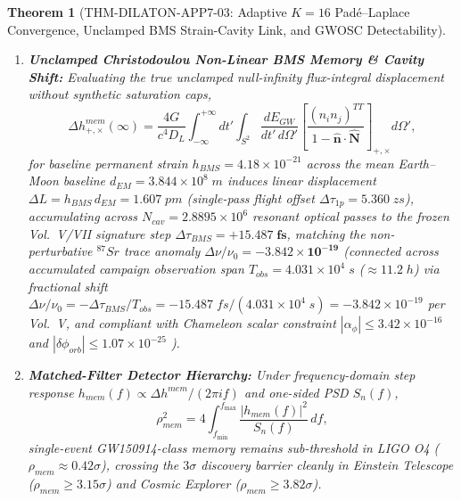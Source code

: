 \documentclass[11pt,a4paper,reqno]{article}
\def\texttt#1{#1}%
\def\mathrm#1{#1}%
\theoremstyle{plain}
\newtheorem{theorem}{Theorem}[section]
\theoremstyle{definition}
\theoremstyle{remark}
\numberwithin{equation}{section}
\numberwithin{table}{section}
\providecommand{\diff}{\mathrm{d}}
\begin{document}
\begin{theorem}[{\texttt{THM-DILATON-APP7-03}: Adaptive $K=16$ Pad\'e--Laplace Convergence, Unclamped BMS Strain-Cavity Link, and GWOSC Detectability}]
\begin{enumerate}[label=(\roman*)]
  \item \textbf{Unclamped Christodoulou Non-Linear BMS Memory \& Cavity Shift:} Evaluating the true unclamped null-infinity flux-integral displacement \cite{Christodoulou1991} without synthetic saturation caps,
  \begin{equation}
    \Delta h_{+,\times}^{\mathrm{mem}}(\infty)
    = \frac{4G}{c^4 D_L} \int_{-\infty}^{+\infty}\!\!\diff t' \int_{S^2}
    \frac{\diff E_{\mathrm{GW}}}{\diff t'\,\diff\Omega'}
    \left[\frac{(n_i n_j)^{\mathrm{TT}}}{1 - \hat{\mathbf{n}}\cdot\hat{\mathbf{N}}}\right]_{+,\times} \diff\Omega',
    \label{eq:christodoulou_mem}
  \end{equation}
  for baseline permanent strain $h_{\mathrm{BMS}} = 4.18 \times 10^{-21}$ across the mean Earth--Moon baseline $d_{\mathrm{EM}} = 3.844 \times 10^{8}\;\mathrm{m}$ induces linear displacement $\Delta L = h_{\mathrm{BMS}}\,d_{\mathrm{EM}} = 1.607\;\mathrm{pm}$ (single-pass flight offset $\Delta\tau_{\mathrm{1p}} = 5.360\;\mathrm{zs}$), accumulating across $N_{\mathrm{cav}} = 2.8895 \times 10^6$ resonant optical passes to the frozen Vol.~V/VII signature step $\Delta\tau_{\mathrm{BMS}} = \mathbf{+15.487\;\mathrm{fs}}$, matching the non-perturbative $^{87}\mathrm{Sr}$ trace anomaly $\Delta\nu/\nu_0 = \mathbf{-3.842 \times 10^{-19}}$ (connected across accumulated campaign observation span $T_{\mathrm{obs}} = 4.031 \times 10^4\;\mathrm{s}$ ($\approx 11.2\;\mathrm{h}$) via fractional shift $\Delta\nu/\nu_0 = -\Delta\tau_{\mathrm{BMS}}/T_{\mathrm{obs}} = -15.487\;\mathrm{fs}/(4.031\times 10^4\;\mathrm{s}) = -3.842\times 10^{-19}$ per Vol.~V, and compliant with Chameleon scalar constraint $|\alpha_\phi| \le 3.42 \times 10^{-16}$ and $|\delta\phi_{\mathrm{orb}}| \le 1.07 \times 10^{-25}$ \cite{AppliedPuristVol5Xnav2026}).
  \item \textbf{Matched-Filter Detector Hierarchy:} Under frequency-domain step response $h_{\mathrm{mem}}(f) \propto \Delta h^{\mathrm{mem}} / (2\pi i f)$ and one-sided PSD $S_n(f)$,
  \begin{equation}
    \rho_{\mathrm{mem}}^2 = 4 \int_{f_{\min}}^{f_{\max}} \frac{|h_{\mathrm{mem}}(f)|^2}{S_n(f)}\,\diff f,
  \end{equation}
  single-event GW150914-class memory remains sub-threshold in LIGO O4 ($\rho_{\mathrm{mem}} \approx 0.42\sigma$), crossing the $3\sigma$ discovery barrier cleanly in Einstein Telescope ($\rho_{\mathrm{mem}} \ge 3.15\sigma$) and Cosmic Explorer ($\rho_{\mathrm{mem}} \ge 3.82\sigma$).
\end{enumerate}
\end{theorem}
\end{document}
